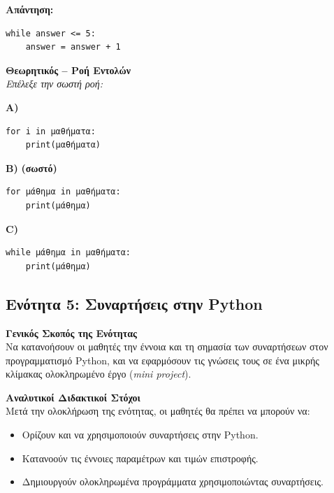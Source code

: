 \documentclass[11pt]{report}
\begin{document}
\textbf{Απάντηση:}
\begin{tcolorbox}[colback=green!5!white, colframe=black!75!black]
\begin{verbatim}
while answer <= 5:
    answer = answer + 1
\end{verbatim}
\end{tcolorbox}


\vspace{1em}
\textbf{Θεωρητικός – Ροή Εντολών} \\[0.5em]
\textit{Επέλεξε την σωστή ροή:}

\textbf{A)}
\begin{tcolorbox}[colback=gray!5!white, colframe=black!75!black]
\begin{verbatim}
for i in μαθήματα:
    print(μαθήματα)
\end{verbatim}
\end{tcolorbox}

\textbf{B)} \textbf{(σωστό)}
\begin{tcolorbox}[colback=gray!5!white, colframe=black!75!black]
\begin{verbatim}
for μάθημα in μαθήματα:
    print(μάθημα)
\end{verbatim}
\end{tcolorbox}

\textbf{C)}
\begin{tcolorbox}[colback=gray!5!white, colframe=black!75!black]
\begin{verbatim}
while μάθημα in μαθήματα:
    print(μάθημα)
\end{verbatim}
\end{tcolorbox}

\subsection{\textbf{Ενότητα 5: Συναρτήσεις στην Python}}

\textbf{Γενικός Σκοπός της Ενότητας} \\[0.5em]
Να κατανοήσουν οι μαθητές την έννοια και τη σημασία των συναρτήσεων στον προγραμματισμό Python, και να εφαρμόσουν τις γνώσεις τους σε ένα μικρής κλίμακας ολοκληρωμένο έργο (\textit{mini project}).

\vspace{1em}
\textbf{Αναλυτικοί Διδακτικοί Στόχοι} \\[0.5em]
Μετά την ολοκλήρωση της ενότητας, οι μαθητές θα πρέπει να μπορούν να:
\begin{itemize}
    \item Ορίζουν και να χρησιμοποιούν συναρτήσεις στην Python.
    \item Κατανοούν τις έννοιες παραμέτρων και τιμών επιστροφής.
    \item Δημιουργούν ολοκληρωμένα προγράμματα χρησιμοποιώντας συναρτήσεις.
\end{itemize}
\end{document}
